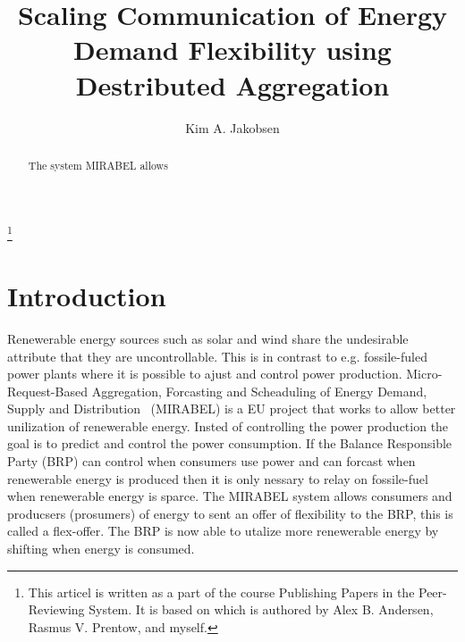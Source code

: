 \documentclass{ifacconf}
\begin{document}
\begin{frontmatter}

\title{Scaling Communication of Energy Demand Flexibility using Destributed Aggregation} %

\thanks[footnoteinfo]{This articel is written as a part of the course Publishing Papers in the Peer-Reviewing System. It is based on \cite{} which is authored by Alex B. Andersen, Rasmus V. Prentow, and myself.}

\author[First]{Kim A. Jakobsen} 


\address[First]{Department of Computer Science, Aalborg University, Selma Lagerl\"{o}fs Vej 300 DK-9220 Aalborg East (e-mail: kjakob09@student.aau.dk).}                                              


          



\begin{abstract}                          %
The system MIRABEL allows 
\end{abstract}

\end{frontmatter}

\section{Introduction}



Renewerable energy sources such as solar and wind share the undesirable attribute that they are uncontrollable. 
This is in contrast to e.g. fossile-fuled power plants where it is possible to ajust and control power production. 
Micro-Request-Based Aggregation, Forcasting and Scheaduling of Energy Demand, Supply and Distribution~\cite{} (MIRABEL) is a EU project that works to allow better unilization of renewerable energy. 
Insted of controlling the power production the goal is to predict and control the power consumption. 
If the Balance Responsible Party (BRP) can control when consumers use power and can forcast when renewerable energy is produced then it is only nessary to relay on fossile-fuel when renewerable energy is sparce.
The MIRABEL system allows consumers and producsers (prosumers) of energy to sent an offer of flexibility to the BRP, this is called a flex-offer. 
The BRP is now able to utalize more renewerable energy by shifting when energy is consumed.
\end{document}
